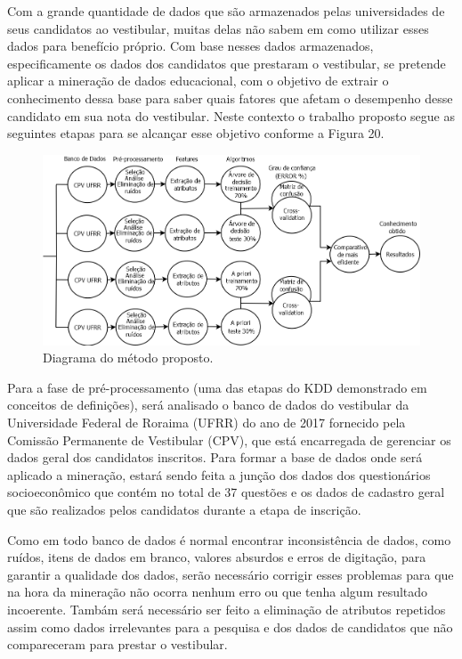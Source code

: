 \label{chapter:metodo}

\par
Com a grande quantidade de dados que são armazenados pelas universidades de seus candidatos ao vestibular, muitas delas não sabem em como utilizar esses dados para benefício próprio. Com base nesses dados armazenados, especificamente os dados dos candidatos que prestaram o vestibular, se pretende aplicar a mineração de dados educacional, com o objetivo de extrair o conhecimento dessa base para saber quais fatores que afetam o desempenho desse candidato em sua nota do vestibular. Neste contexto o trabalho proposto segue as seguintes etapas para se alcançar esse objetivo conforme a Figura 20.

\par
\begin{figure}[!htp]
	\begin{center}
    \caption{\label{fig:waveform_fig} Diagrama do método proposto.}
	\includegraphics[scale=0.45]{Figuras/Caso_de_uso_metodo_TCC1.png}
	\end{center}
\end{figure}

\par
Para a fase de pré-processamento (uma das etapas do KDD demonstrado em conceitos de definições), será analisado o banco de dados do vestibular da Universidade Federal de Roraima (UFRR) do ano de 2017 fornecido pela Comissão Permanente de Vestibular (CPV), que está encarregada de gerenciar os dados geral dos candidatos inscritos. Para formar a base de dados onde será aplicado a mineração, estará sendo feita a junção dos dados dos questionários socioeconômico que contém no total de 37 questões e os dados de cadastro geral que são realizados pelos candidatos durante a etapa de inscrição.


\par
Como em todo banco de dados é normal encontrar inconsistência de dados, como ruídos, itens de dados em branco, valores absurdos e erros de digitação, para garantir a qualidade dos dados, serão necessário corrigir esses problemas para que na hora da mineração não ocorra nenhum erro ou que tenha algum resultado incoerente. Tambám será necessário ser feito a eliminação de atributos repetidos assim como dados irrelevantes para a pesquisa e dos dados de candidatos que não compareceram para prestar o vestibular.

